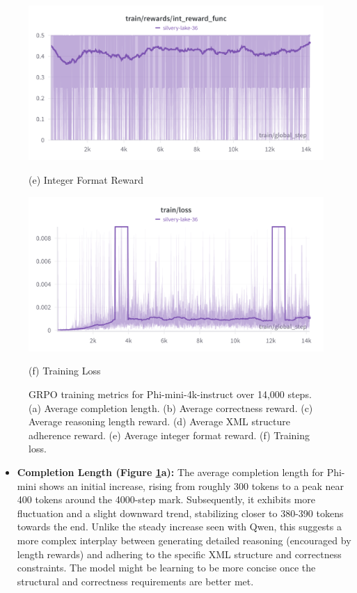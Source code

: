 \documentclass[11pt]{article}
\begin{document}
\begin{itemize}
\begin{figure}[htbp]
    \begin{minipage}{\graphwidthtwo}
        \centering
        \includegraphics[width=\linewidth]{phi/int_reward.png} %
        \caption*{(e) Integer Format Reward}
    \end{minipage}\hfill
    \begin{minipage}{\graphwidthtwo}
        \centering
        \includegraphics[width=\linewidth]{phi/train_loss.png} %
        \caption*{(f) Training Loss}
    \end{minipage}


    \caption{GRPO training metrics for Phi-mini-4k-instruct over 14,000 steps. (a) Average completion length. (b) Average correctness reward. (c) Average reasoning length reward. (d) Average XML structure adherence reward. (e) Average integer format reward. (f) Training loss.}
    \label{fig:grpo_phi_analysis}
\end{figure}

\begin{itemize}
    \item \textbf{Completion Length (Figure \ref{fig:grpo_phi_analysis}a):} The average completion length for Phi-mini shows an initial increase, rising from roughly 300 tokens to a peak near 400 tokens around the 4000-step mark. Subsequently, it exhibits more fluctuation and a slight downward trend, stabilizing closer to 380-390 tokens towards the end. Unlike the steady increase seen with Qwen, this suggests a more complex interplay between generating detailed reasoning (encouraged by length rewards) and adhering to the specific XML structure and correctness constraints. The model might be learning to be more concise once the structural and correctness requirements are better met.


\end{itemize}
\end{itemize}
\end{document}
